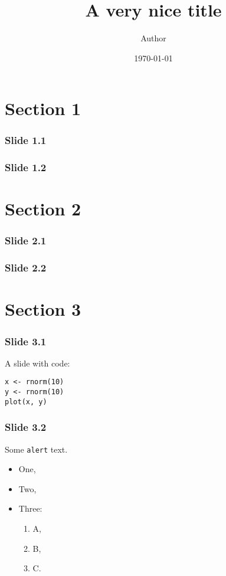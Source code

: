 \documentclass{beamer}
\title{A very nice title}
\author{Author}
\date{\today}
\begin{document}
\begin{frame}
\titlepage
\end{frame}

\section{Section 1}

\begin{frame}
\frametitle{Slide 1.1}
\blindtext
\end{frame}

\begin{frame}
\frametitle{Slide 1.2}
\blindtext
\end{frame}

\section{Section 2}

\begin{frame}
\frametitle{Slide 2.1}
\blindtext
\end{frame}

\begin{frame}
\frametitle{Slide 2.2}
\blindtext
\end{frame}

\section{Section 3}

\begin{frame}[fragile] %
\frametitle{Slide 3.1}
A slide with code:
\begin{verbatim}
x <- rnorm(10)
y <- rnorm(10)
plot(x, y)
\end{verbatim}
\end{frame}

\begin{frame}[fragile]
    \frametitle{Slide 3.2}

    \alert{Some \texttt{alert} text.}

    \begin{itemize}
        \item One,
        \item Two,
        \item Three:
        \begin{enumerate}
            \item A,
            \item B,
            \item C.
        \end{enumerate}
    \end{itemize}
\end{frame}
\end{document}
